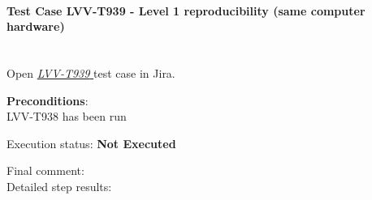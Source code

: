 \documentclass[DM,lsstdraft,STR,toc]{lsstdoc}
\begin{document}
    \paragraph{Test Case LVV-T939 - Level 1 reproducibility (same computer hardware)
 }\mbox{}\\

Open  \href{https://jira.lsstcorp.org/secure/Tests.jspa#/testCase/LVV-T939}{\textit{ LVV-T939 } }
test case in Jira.

    

    \textbf{ Preconditions}:\\
    LVV-T938 has been run


    Execution status: {\bf Not Executed }

    Final comment:\\


    Detailed step results:
\end{document}
